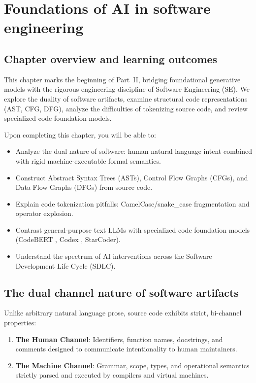 \documentclass[../../main.tex]{subfiles}
\begin{document}
\chapter{Foundations of AI in software engineering}
\label{ch:ai_in_software_engineering}

\section{Chapter overview and learning outcomes}
This chapter marks the beginning of Part~II, bridging foundational generative models with the rigorous engineering discipline of Software Engineering (SE). We explore the duality of software artifacts, examine structural code representations (AST, CFG, DFG), analyze the difficulties of tokenizing source code, and review specialized code foundation models.

Upon completing this chapter, you will be able to:
\begin{itemize}
    \item Analyze the dual nature of software: human natural language intent combined with rigid machine-executable formal semantics.
    \item Construct Abstract Syntax Trees (ASTs), Control Flow Graphs (CFGs), and Data Flow Graphs (DFGs) from source code.
    \item Explain code tokenization pitfalls: CamelCase/snake\_case fragmentation and operator explosion.
    \item Contrast general-purpose text LLMs with specialized code foundation models (CodeBERT \citep{feng2020codebert}, Codex \citep{chen2021codex}, StarCoder).
    \item Understand the spectrum of AI interventions across the Software Development Life Cycle (SDLC).
\end{itemize}

\section{The dual channel nature of software artifacts}
Unlike arbitrary natural language prose, source code exhibits strict, bi-channel properties:
\begin{enumerate}
    \item \textbf{The Human Channel}: Identifiers, function names, docstrings, and comments designed to communicate intentionality to human maintainers.
    \item \textbf{The Machine Channel}: Grammar, scope, types, and operational semantics strictly parsed and executed by compilers and virtual machines.
\end{enumerate}
\end{document}
